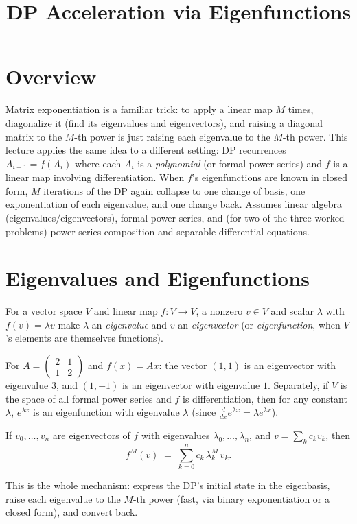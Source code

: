 \documentclass[11pt]{article}
\title{DP Acceleration via Eigenfunctions}
\author{}
\date{}
\begin{document}
\thispagestyle{fancy}


\section{Overview}
Matrix exponentiation is a familiar trick: to apply a linear map $M$
times, diagonalize it (find its eigenvalues and eigenvectors), and
raising a diagonal matrix to the $M$-th power is just raising each
eigenvalue to the $M$-th power. This lecture applies the same idea to a
different setting: DP recurrences $A_{i+1} = f(A_i)$ where each $A_i$ is
a \emph{polynomial} (or formal power series) and $f$ is a linear map
involving differentiation. When $f$'s eigenfunctions are known in closed
form, $M$ iterations of the DP again collapse to one change of basis, one
exponentiation of each eigenvalue, and one change back. Assumes linear
algebra (eigenvalues/eigenvectors), formal power series, and (for two of
the three worked problems) power series composition and separable
differential equations.

\section{Eigenvalues and Eigenfunctions}
\begin{definitionbox}
For a vector space $V$ and linear map $f: V \to V$, a nonzero
$v \in V$ and scalar $\lambda$ with $f(v) = \lambda v$ make $\lambda$ an
\emph{eigenvalue} and $v$ an \emph{eigenvector} (or \emph{eigenfunction},
when $V$'s elements are themselves functions).
\end{definitionbox}

\begin{examplebox}
For $A = \begin{pmatrix}2&1\\1&2\end{pmatrix}$ and $f(x)=Ax$: the vector
$(1,1)$ is an eigenvector with eigenvalue $3$, and $(1,-1)$ is an
eigenvector with eigenvalue $1$. Separately, if $V$ is the space of all
formal power series and $f$ is differentiation, then for any constant
$\lambda$, $e^{\lambda x}$ is an eigenfunction with eigenvalue $\lambda$
(since $\frac{d}{dx}e^{\lambda x} = \lambda e^{\lambda x}$).
\end{examplebox}

\begin{theorembox}
If $v_0,\ldots,v_n$ are eigenvectors of $f$ with eigenvalues
$\lambda_0,\ldots,\lambda_n$, and $v = \sum_k c_k v_k$, then
\[
  f^M(v) \;=\; \sum_{k=0}^n c_k\, \lambda_k^M\, v_k.
\]
\end{theorembox}
This is the whole mechanism: express the DP's initial state in the
eigenbasis, raise each eigenvalue to the $M$-th power (fast, via binary
exponentiation or a closed form), and convert back.
\end{document}

